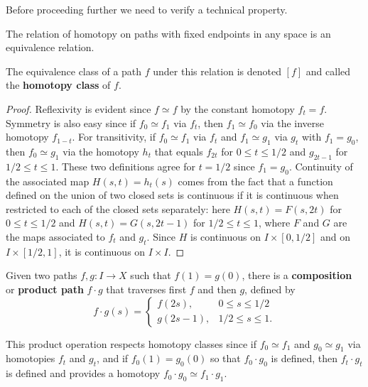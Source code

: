 Before proceeding further we need to verify a technical property.

\begin{proposition}
\label{prop:homotopy-paths-equivalence-relation}
The relation of homotopy on paths with fixed endpoints in any space is an
equivalence relation.
\end{proposition}

The equivalence class of a path $f$ under this relation is denoted $[f]$ and called the
\textbf{homotopy class} of $f$.

\begin{proof}
Reflexivity is evident since $f \simeq f$ by the constant homotopy $f_t = f$. Symmetry
is also easy since if $f_0 \simeq f_1$ via $f_t$, then $f_1 \simeq f_0$ via the inverse homotopy
$f_{1-t}$. For transitivity, if $f_0 \simeq f_1$ via $f_t$ and $f_1 \simeq g_1$ via $g_t$ with $f_1 = g_0$,
then $f_0 \simeq g_1$ via the homotopy $h_t$ that equals $f_{2t}$ for $0 \le t \le 1/2$ and $g_{2t-1}$
for $1/2 \le t \le 1$. These two definitions agree for $t=1/2$ since $f_1 = g_0$. Continuity of
the associated map $H(s,t) = h_t(s)$ comes from the fact that a function defined on
the union of two closed sets is continuous if it is continuous when restricted to each
of the closed sets separately: here $H(s,t) = F(s,2t)$ for $0 \le t \le 1/2$ and
$H(s,t) = G(s,2t-1)$ for $1/2 \le t \le 1$, where $F$ and $G$ are the maps associated to
$f_t$ and $g_t$. Since $H$ is continuous on $I \times [0,1/2]$ and on $I \times [1/2,1]$, it is
continuous on $I \times I$.
\end{proof}



\begin{definition}
\label{def:path-composition}
Given two paths $f,g : I \to X$ such that $f(1) = g(0)$, there is a \textbf{composition} or
\textbf{product path} $f \cdot g$ that traverses first $f$ and then $g$, defined by
\[
f \cdot g(s) = \begin{cases} f(2s), & 0 \le s \le 1/2 \\ g(2s-1), & 1/2 \le s \le 1. \end{cases}
\]
\end{definition}



This product operation respects homotopy classes since if $f_0 \simeq f_1$ and
$g_0 \simeq g_1$ via homotopies $f_t$ and $g_t$, and if $f_0(1) = g_0(0)$ so that $f_0 \cdot g_0$ is
defined, then $f_t \cdot g_t$ is defined and provides a homotopy $f_0 \cdot g_0 \simeq f_1 \cdot g_1$.

